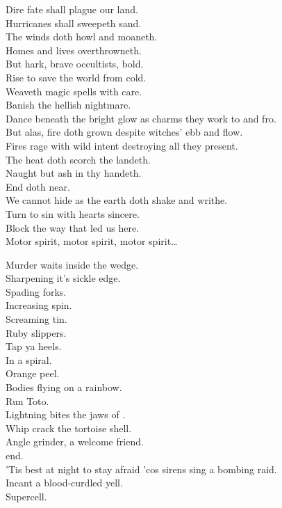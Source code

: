 Dire fate shall plague our land. \\
Hurricanes shall sweepeth sand. \\
The winds doth howl and moaneth. \\
Homes and lives overthrowneth. \\
But hark, brave occultists, bold. \\
Rise to save the world from cold. \\
Weaveth magic spells with care. \\
Banish the hellish nightmare. \\

Dance beneath the  bright glow as charms they work to and fro. \\
But alas, fire doth grown despite witches' ebb and flow. \\
Fires rage with wild intent destroying all they present. \\
The heat doth scorch the landeth. \\
Naught but ash in thy handeth. \\

End doth near. \\
We cannot hide as the earth doth shake and writhe. \\
Turn to sin with hearts sincere. \\
Block the way that led us here. \\

Motor spirit, motor spirit, motor spirit… \\



Murder waits inside the wedge. \\
Sharpening it's sickle edge. \\
Spading forks. \\
Increasing spin. \\
Screaming tin. \\
Ruby slippers. \\
Tap ya heels. \\
In a spiral. \\
Orange peel. \\
Bodies flying on a rainbow. \\
Run Toto. \\
Lightning bites the jaws of . \\
Whip crack the tortoise shell. \\
Angle grinder, a welcome friend. \\
 end. \\
'Tis best at night to stay afraid 'cos sirens sing a bombing raid. \\
Incant a blood-curdled yell. \\
Supercell. \\

